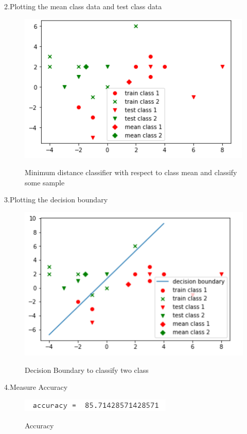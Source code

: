 \documentclass[12pt]{article}
\begin{document}
2.Plotting the mean class data and test class data\\

\begin{figure}[htbp]
{\includegraphics{2.PNG}}
\caption{Minimum distance classifier with respect to class mean and classify some sample\\}
\label{fig}
\end{figure}

\newpage

3.Plotting the decision boundary\\

\begin{figure}[htbp]
{\includegraphics{3.PNG}}
\caption{Decision Boundary to classify two class\\}
\label{fig}
\end{figure}

4.Measure Accuracy\\

\begin{figure}[htbp]
{\includegraphics{4.PNG}}
\caption{Accuracy\\}
\label{fig}
\end{figure}
\end{document}
